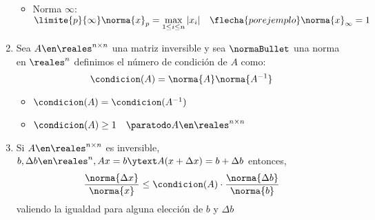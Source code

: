 \begin{enumerate}[label=\tiny\purple{\faIcon{snowman}}]
\begin{itemize}
          \item Norma $\infty$:
                $\limite{p}{\infty} \norma{x}_p = \max\limits_{1\leq i \leq n} |x_i|
                  \quad
                  \flecha{por ejemplo}
                  \norma{x}_{\infty} = 1 \quad$
        \end{itemize}

  \item Sea $A \en \reales^{n \times n}$ una matriz inversible y sea $\normaBullet$ una norma en
        $\reales^n$ definimos el número de condición de $A$ como:
        $$
          \condicion(A) = \norma{A}\norma{A^{-1}}
        $$
        \begin{itemize}
          \item $\condicion(A) = \condicion(A^{-1})$
          \item $\condicion(A) \geq 1 \quad \paratodo A \en \reales^{n \times n}$
        \end{itemize}
  \item Si $A \en \reales^{n \times n}$ es inversible, $b, \Delta b \en \reales^{n}, Ax = b \ytext A(x + \Delta x) = b + \Delta b$ entonces,
        $$
          \frac{\norma{\Delta x}}{\norma{x}} \leq \condicion(A) \cdot \frac{\norma{\Delta b}}{\norma{b}}
        $$
        valiendo la igualdad para alguna elección de $b$ y $\Delta b$

\end{enumerate}


